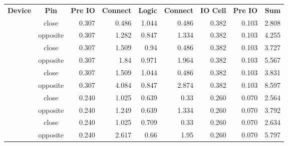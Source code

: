 \documentclass[11pt]{article}
\begin{document}
 
 
\renewcommand{\arraystretch}{1.5}
 \newcommand{\ct}{\color{white}\bf}
\begin{tabular}{cc*{7}{r}}
\rowcolor{Blue!50}
\ct Device & \ct Pin & \ct Pre IO & \ct Connect & \ct Logic & \ct Connect & \ct IO Cell & \ct Pre IO & \ct Sum \\
\rowcolor{white}
\hline  & close & 0.307 & 0.486 & 1.044 & 0.486 & 0.382 & 0.103 & 2.808\\
\rowcolor{white}
 \multirow{-2}{*}{lp384} & opposite & 0.307 & 1.282 & 0.847 & 1.334 & 0.382 & 0.103 & 4.255\\
\rowcolor{blue!10}
\hline  & close & 0.307 & 1.509 & 0.94 & 0.486 & 0.382 & 0.103 & 3.727\\
\rowcolor{blue!10}
 \multirow{-2}{*}{lp1k} & opposite & 0.307 & 1.84 & 0.971 & 1.964 & 0.382 & 0.103 & 5.567\\
\rowcolor{white}
\hline  & close & 0.307 & 1.509 & 1.044 & 0.486 & 0.382 & 0.103 & 3.831\\
\rowcolor{white}
 \multirow{-2}{*}{lp8k} & opposite & 0.307 & 4.084 & 0.847 & 2.874 & 0.382 & 0.103 & 8.597\\
\rowcolor{blue!10}
\hline  & close & 0.240 & 1.025 & 0.639 & 0.33 & 0.260 & 0.070 & 2.564\\
\rowcolor{blue!10}
 \multirow{-2}{*}{hx1k} & opposite & 0.240 & 1.249 & 0.639 & 1.334 & 0.260 & 0.070 & 3.792\\
\rowcolor{white}
\hline  & close & 0.240 & 1.025 & 0.709 & 0.33 & 0.260 & 0.070 & 2.634\\
\rowcolor{white}
 \multirow{-2}{*}{hx8k} & opposite & 0.240 & 2.617 & 0.66 & 1.95 & 0.260 & 0.070 & 5.797\\
\end{tabular}
\end{document}
